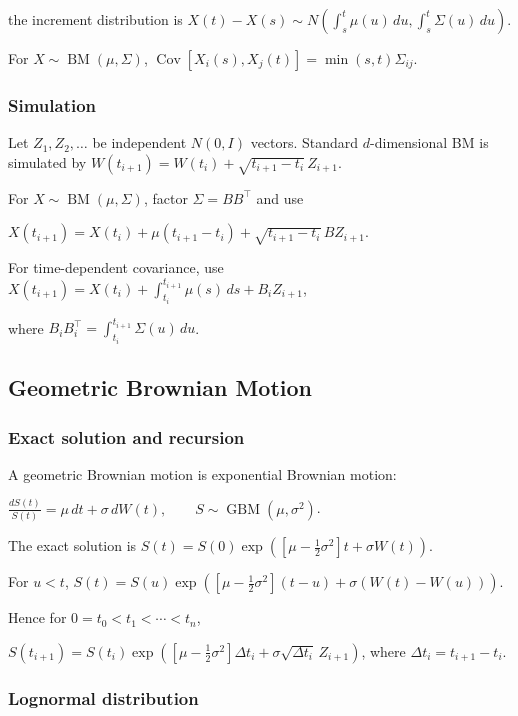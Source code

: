 the increment distribution is
$X(t)-X(s)\sim N\left(\int_s^t\mu(u)\,du,\int_s^t\Sigma(u)\,du\right)$.

For $X\sim\operatorname{BM}(\mu,\Sigma)$,
$\operatorname{Cov}[X_i(s),X_j(t)]=\min(s,t)\Sigma_{ij}$.

\subsubsection*{Simulation}

Let $Z_1,Z_2,\ldots$ be independent $N(0,I)$ vectors. Standard $d$-dimensional BM is simulated by
$W(t_{i+1})=W(t_i)+\sqrt{t_{i+1}-t_i}\,Z_{i+1}$.

For $X\sim\operatorname{BM}(\mu,\Sigma)$, factor $\Sigma=BB^\top$ and use

$X(t_{i+1})=X(t_i)+\mu(t_{i+1}-t_i)+\sqrt{t_{i+1}-t_i}\,BZ_{i+1}$.

For time-dependent covariance, use
$X(t_{i+1})=X(t_i)+\int_{t_i}^{t_{i+1}}\mu(s)\,ds+B_iZ_{i+1}$,

where
$B_iB_i^\top=\int_{t_i}^{t_{i+1}}\Sigma(u)\,du$.

\subsection{Geometric Brownian Motion}

\subsubsection*{Exact solution and recursion}

A geometric Brownian motion is exponential Brownian motion:

$\frac{dS(t)}{S(t)}=\mu\,dt+\sigma\,dW(t),\qquad S\sim\operatorname{GBM}(\mu,\sigma^2)$.

The exact solution is
$S(t)=S(0)\exp\left(\left[\mu-\frac12\sigma^2\right]t+\sigma W(t)\right)$.

For $u<t$,
$S(t)=S(u)\exp\left(\left[\mu-\frac12\sigma^2\right](t-u)+\sigma(W(t)-W(u))\right)$.

Hence for $0=t_0<t_1<\cdots<t_n$,

$S(t_{i+1})=S(t_i)\exp\left(\left[\mu-\frac12\sigma^2\right]\Delta t_i+\sigma\sqrt{\Delta t_i}\,Z_{i+1}\right)$,
where $\Delta t_i=t_{i+1}-t_i$. 
\subsubsection*{Lognormal distribution}

